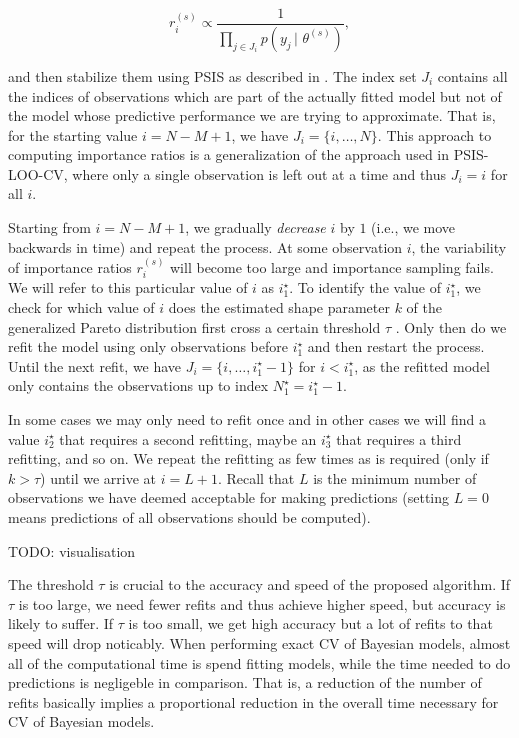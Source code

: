\documentclass[american,]{article}
\begin{document}
\begin{equation}
r_i^{(s)} \propto \frac{1}{\prod_{j \in J_i} p(y_j \,|\, \,\theta^{(s)})},
\end{equation}

and then stabilize them using PSIS as described in
\citet{vehtari2017psis}. The index set \(J_i\) contains all the indices
of observations which are part of the actually fitted model but not of
the model whose predictive performance we are trying to approximate.
That is, for the starting value \(i = N - M + 1\), we have
\(J_i = \{i, \ldots, N\}\). This approach to computing importance ratios
is a generalization of the approach used in PSIS-LOO-CV, where only a
single observation is left out at a time and thus \(J_i = i\) for all
\(i\).

Starting from \(i = N - M + 1\), we gradually \emph{decrease} \(i\) by
\(1\) (i.e., we move backwards in time) and repeat the process. At some
observation \(i\), the variability of importance ratios \(r_i^{(s)}\)
will become too large and importance sampling fails. We will refer to
this particular value of \(i\) as \(i^\star_1\). To identify the value
of \(i^\star_1\), we check for which value of \(i\) does the estimated
shape parameter \(k\) of the generalized Pareto distribution first cross
a certain threshold \(\tau\) \citep{vehtari2017psis}. Only then do we
refit the model using only observations before \(i^\star_1\) and then
restart the process. Until the next refit, we have
\(J_i = \{i, \ldots, i^\star_1 -1 \}\) for \(i < i^\star_1\), as the
refitted model only contains the observations up to index
\(N^\star_1 = i^\star_1 - 1\).

In some cases we may only need to refit once and in other cases we will
find a value \(i^\star_2\) that requires a second refitting, maybe an
\(i^\star_3\) that requires a third refitting, and so on. We repeat the
refitting as few times as is required (only if \(k > \tau\)) until we
arrive at \(i = L + 1\). Recall that \(L\) is the minimum number of
observations we have deemed acceptable for making predictions (setting
\(L=0\) means predictions of all observations should be computed).

TODO: visualisation

The threshold \(\tau\) is crucial to the accuracy and speed of the
proposed algorithm. If \(\tau\) is too large, we need fewer refits and
thus achieve higher speed, but accuracy is likely to suffer. If \(\tau\)
is too small, we get high accuracy but a lot of refits to that speed
will drop noticably. When performing exact CV of Bayesian models, almost
all of the computational time is spend fitting models, while the time
needed to do predictions is negligeble in comparison. That is, a
reduction of the number of refits basically implies a proportional
reduction in the overall time necessary for CV of Bayesian models.
\end{document}
